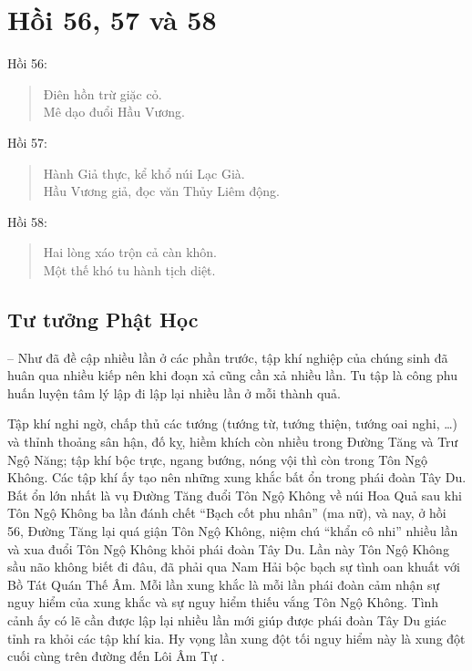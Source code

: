 \chapter{Hồi 56, 57 và 58} %
\label{cha:hoi_56_57}

Hồi 56:

\begin{verse}
\begin{itshape}
Điên hồn trừ giặc cỏ.\\
Mê dạo đuổi Hầu Vương.
\end{itshape}
\end{verse}

Hồi 57:

\begin{verse}
\begin{itshape}
Hành Giả thực, kể khổ núi Lạc Già.\\
Hầu Vương giả, đọc văn Thủy Liêm động.
\end{itshape}
\end{verse}

Hồi 58:

\begin{verse}
\begin{itshape}
Hai lòng xáo trộn cả càn khôn.\\
Một thế khó tu hành tịch diệt.
\end{itshape}
\end{verse}

\section{Tư tưởng Phật Học} %
\label{sec:56_57_phat_hoc}

-- Như đã đề cập nhiều lần ở các phần trước, tập khí nghiệp của chúng sinh đã huân qua nhiều kiếp nên khi đoạn xả cũng cần xả nhiều lần. Tu tập là công phu huấn luyện tâm lý lập đi lập lại nhiều lần ở mỗi thành quả.

Tập khí nghi ngờ, chấp thủ các tướng (tướng từ, tướng thiện, tướng oai nghi, \ldots) và thỉnh thoảng sân hận, đố kỵ, hiềm khích còn nhiều trong Đường Tăng và Trư Ngộ Năng; tập khí bộc trực, ngang bướng, nóng vội thì còn trong Tôn Ngộ Không. Các tập khí ấy tạo nên những xung khắc bất ổn trong phái đoàn Tây Du. Bất ổn lớn nhất là vụ Đường Tăng đuổi Tôn Ngộ Không về núi Hoa Quả sau khi Tôn Ngộ Không ba lần đánh chết ``Bạch cốt phu nhân'' (ma nữ), và nay, ở hồi 56, Đường Tăng lại quá giận Tôn Ngộ Không, niệm chú ``khẩn cô nhi'' nhiều lần và xua đuổi Tôn Ngộ Không khỏi phái đoàn Tây Du. Lần này Tôn Ngộ Không sầu não không biết đi đâu, đã phải qua Nam Hải bộc bạch sự tình oan khuất với Bồ Tát Quán Thế Âm. Mỗi lần xung khắc là mỗi lần phái đoàn cảm nhận sự nguy hiểm của xung khắc và sự nguy hiểm thiếu vắng Tôn Ngộ Không. Tình cảnh ấy có lẽ cần được lập lại nhiều lần mới giúp được phái đoàn Tây Du giác tỉnh ra khỏi các tập khí kia. Hy vọng lần xung đột tối nguy hiểm này là xung đột cuối cùng trên đường đến Lôi Âm Tự .

